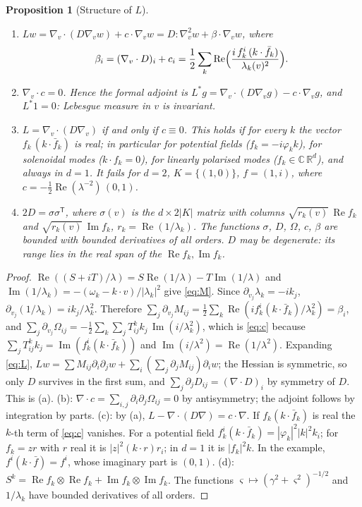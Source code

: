 \documentclass[11pt]{article}
\newcommand{\R}{\mathbb{R}}
\newcommand{\C}{\mathbb{C}}
\renewcommand{\Re}{\operatorname{Re}}
\renewcommand{\Im}{\operatorname{Im}}
\newtheorem{proposition}[theorem]{Proposition}
\theoremstyle{remark}
\begin{document}
\begin{proposition}[Structure of $L$]\label{prop:L}
\begin{enumerate}
  \item[(a)] $Lw=\nabla_v\cdot(D\nabla_vw)+c\cdot\nabla_vw
    =D:\nabla_v^2w+\beta\cdot\nabla_vw$, where
    \[
      \beta_i=(\nabla_v\cdot D)_i+c_i
      =\frac12\sum_k\Re\Bigl(\frac{i\,f_k^i\,(k\cdot\bar f_k)}{\lambda_k(v)^2}\Bigr).
    \]
  \item[(b)] $\nabla_v\cdot c=0$. Hence the formal adjoint is
    $L^*g=\nabla_v\cdot(D\nabla_vg)-c\cdot\nabla_vg$, and $L^*1=0$:
    Lebesgue measure in $v$ is invariant.
  \item[(c)] $L=\nabla_v\cdot(D\nabla_v)$ if and only if $c\equiv0$. This
    holds if for every $k$ the vector $f_k\,(k\cdot\bar f_k)$ is real; in
    particular for potential fields ($f_k=-i\varphi_kk$), for solenoidal
    modes ($k\cdot f_k=0$), for linearly polarised modes
    ($f_k\in\C\,\R^d$), and always in $d=1$. It fails for $d=2$,
    $K=\{(1,0)\}$, $f=(1,i)$, where $c=-\tfrac12\Re(\lambda^{-2})\,(0,1)$.
  \item[(d)] $2D=\sigma\sigma^{\mathsf T}$, where $\sigma(v)$ is the
    $d\times2|K|$ matrix with columns $\sqrt{r_k(v)}\,\Re f_k$ and
    $\sqrt{r_k(v)}\,\Im f_k$, $r_k=\Re(1/\lambda_k)$. The functions
    $\sigma$, $D$, $\Omega$, $c$, $\beta$ are bounded with bounded
    derivatives of all orders. $D$ may be degenerate: its range lies in the
    real span of the $\Re f_k,\Im f_k$.
\end{enumerate}
\end{proposition}

\begin{proof}
$\Re((S+iT)/\lambda)=S\Re(1/\lambda)-T\Im(1/\lambda)$ and
$\Im(1/\lambda_k)=-(\omega_k-k\cdot v)/|\lambda_k|^2$ give \eqref{eq:M}.
Since $\partial_{v_j}\lambda_k=-ik_j$,
$\partial_{v_j}(1/\lambda_k)=ik_j/\lambda_k^2$. Therefore
$\sum_j\partial_{v_j}M_{ij}=\frac12\sum_k\Re(if_k^i(k\cdot\bar
f_k)/\lambda_k^2)=\beta_i$, and
$\sum_j\partial_{v_j}\Omega_{ij}=-\frac12\sum_k\sum_jT^k_{ij}k_j\,
\Im(i/\lambda_k^2)$, which is \eqref{eq:c} because
$\sum_jT^k_{ij}k_j=\Im(f_k^i(k\cdot\bar f_k))$ and
$\Im(i/\lambda^2)=\Re(1/\lambda^2)$. Expanding \eqref{eq:L},
$Lw=\sum M_{ij}\partial_i\partial_jw+\sum_i(\sum_j\partial_jM_{ij})\partial_iw$;
the Hessian is symmetric, so only $D$ survives in the first sum, and
$\sum_j\partial_jD_{ij}=(\nabla\cdot D)_i$ by symmetry of $D$. This is (a).
(b): $\nabla\cdot c=\sum_{i,j}\partial_i\partial_j\Omega_{ij}=0$ by
antisymmetry; the adjoint follows by integration by parts. (c): by (a),
$L-\nabla\cdot(D\nabla)=c\cdot\nabla$. If $f_k(k\cdot\bar f_k)$ is real the
$k$-th term of \eqref{eq:c} vanishes. For a potential field
$f_k^i(k\cdot\bar f_k)=|\varphi_k|^2|k|^2k_i$; for $f_k=zr$ with $r$ real it
is $|z|^2(k\cdot r)r_i$; in $d=1$ it is $|f_k|^2k$. In the example,
$f^i(k\cdot\bar f)=f^i$, whose imaginary part is $(0,1)$. (d):
$S^k=\Re f_k\otimes\Re f_k+\Im f_k\otimes\Im f_k$. The functions
$\varsigma\mapsto(\gamma^2+\varsigma^2)^{-1/2}$ and $1/\lambda_k$ have
bounded derivatives of all orders.
\end{proof}
\end{document}
